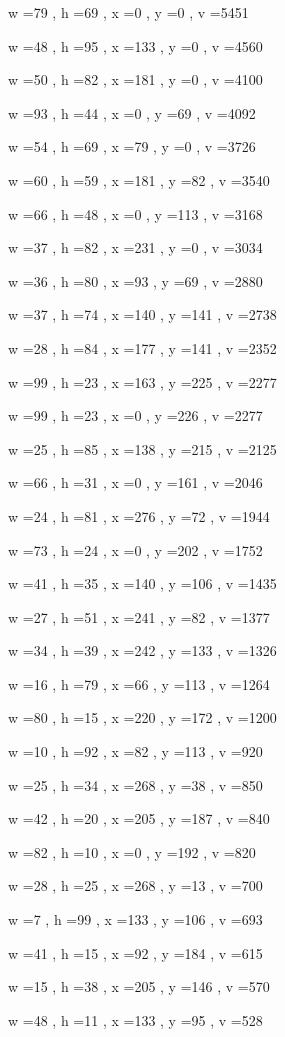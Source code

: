 \documentclass[11pt]{article}
\begin{document}
w =79 , h =69 , x =0 , y =0 , v =5451
\par
w =48 , h =95 , x =133 , y =0 , v =4560
\par
w =50 , h =82 , x =181 , y =0 , v =4100
\par
w =93 , h =44 , x =0 , y =69 , v =4092
\par
w =54 , h =69 , x =79 , y =0 , v =3726
\par
w =60 , h =59 , x =181 , y =82 , v =3540
\par
w =66 , h =48 , x =0 , y =113 , v =3168
\par
w =37 , h =82 , x =231 , y =0 , v =3034
\par
w =36 , h =80 , x =93 , y =69 , v =2880
\par
w =37 , h =74 , x =140 , y =141 , v =2738
\par
w =28 , h =84 , x =177 , y =141 , v =2352
\par
w =99 , h =23 , x =163 , y =225 , v =2277
\par
w =99 , h =23 , x =0 , y =226 , v =2277
\par
w =25 , h =85 , x =138 , y =215 , v =2125
\par
w =66 , h =31 , x =0 , y =161 , v =2046
\par
w =24 , h =81 , x =276 , y =72 , v =1944
\par
w =73 , h =24 , x =0 , y =202 , v =1752
\par
w =41 , h =35 , x =140 , y =106 , v =1435
\par
w =27 , h =51 , x =241 , y =82 , v =1377
\par
w =34 , h =39 , x =242 , y =133 , v =1326
\par
w =16 , h =79 , x =66 , y =113 , v =1264
\par
w =80 , h =15 , x =220 , y =172 , v =1200
\par
w =10 , h =92 , x =82 , y =113 , v =920
\par
w =25 , h =34 , x =268 , y =38 , v =850
\par
w =42 , h =20 , x =205 , y =187 , v =840
\par
w =82 , h =10 , x =0 , y =192 , v =820
\par
w =28 , h =25 , x =268 , y =13 , v =700
\par
w =7 , h =99 , x =133 , y =106 , v =693
\par
w =41 , h =15 , x =92 , y =184 , v =615
\par
w =15 , h =38 , x =205 , y =146 , v =570
\par
w =48 , h =11 , x =133 , y =95 , v =528
\end{document}
